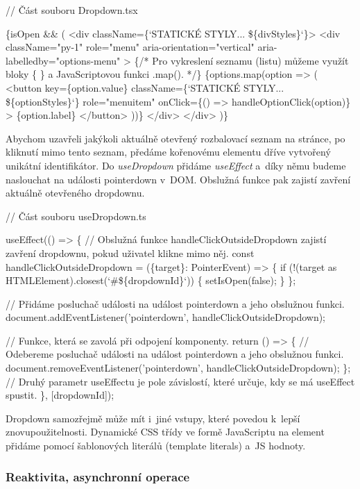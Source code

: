 \begin{prog}
// Část souboru Dropdown.tsx

\{isOpen && (
  <div className=\{`STATICKÉ STYLY... \$\{divStyles\}`\}>
    <div
      className="py-1"
      role="menu"
      aria-orientation="vertical"
      aria-labelledby="options-menu"
    >
      \{/* Pro vykreslení seznamu (listu) můžeme využít bloky \{ \}
       a JavaScriptovou funkci .map(). */\}
      \{options.map(option => (
        <button
          key=\{option.value\}
          className=\{`STATICKÉ STYLY... \$\{optionStyles\}`\}
          role="menuitem"
          onClick=\{() => handleOptionClick(option)\}
        >
          \{option.label\}
        </button>
      ))\}
    </div>
  </div>
)\}
\end{prog}

Abychom uzavřeli jakýkoli aktuálně otevřený rozbalovací seznam na stránce, po kliknutí mimo tento seznam, předáme kořenovému elementu dříve vytvořený unikátní identifikátor. 
Do \emph{useDropdown} přidáme \emph{useEffect} a~díky němu budeme naslouchat na události pointerdown v~DOM. Obslužná funkce pak zajistí zavření aktuálně otevřeného dropdownu.

\begin{prog}
// Část souboru useDropdown.ts

useEffect(() => \{
  // Obslužná funkce handleClickOutsideDropdown zajistí zavření dropdownu,
    pokud uživatel klikne mimo něj.
  const handleClickOutsideDropdown = (\{target\}: PointerEvent) => \{
    if (!(target as HTMLElement).closest(`#\$\{dropdownId\}`)) \{
      setIsOpen(false);
    \}
  \};

  // Přidáme posluchač události na událost pointerdown a jeho obslužnou funkci.
  document.addEventListener('pointerdown', handleClickOutsideDropdown);

  // Funkce, která se zavolá při odpojení komponenty.
  return () => \{
    // Odebereme posluchač události na událost
      pointerdown a jeho obslužnou funkci.
    document.removeEventListener('pointerdown', handleClickOutsideDropdown);
  \};
  // Druhý parametr useEffectu je pole závislostí, 
    které určuje, kdy se má useEffect spustit.
\}, [dropdownId]);
\end{prog}

Dropdown samozřejmě může mít i~jiné vstupy, které povedou k~lepší znovupoužitelnosti. 
Dynamické CSS třídy ve formě JavaScriptu na element přidáme pomocí šablonových literálů (template literals) a~JS hodnoty.

\subsubsection*{Reaktivita, asynchronní operace}

